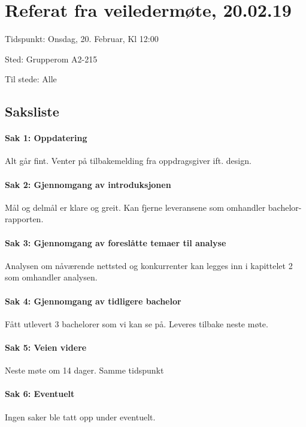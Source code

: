 \chapter{Referat fra veiledermøte, 20.02.19}

Tidspunkt: Onsdag, 20. Februar, Kl 12:00

Sted: Grupperom A2-215

Til stede: Alle	

\section{Saksliste}

\subsubsection{Sak 1: Oppdatering}
Alt går fint. Venter på tilbakemelding fra oppdragsgiver ift. design. 

\subsubsection{Sak 2: Gjennomgang av introduksjonen}
Mål og delmål er klare og greit. Kan fjerne leveransene som omhandler 
bachelor-rapporten. 

\subsubsection{Sak 3: Gjennomgang av foreslåtte temaer til analyse}
Analysen om nåværende nettsted og konkurrenter kan legges inn i kapittelet 2 som
omhandler analysen.

\subsubsection{Sak 4: Gjennomgang av tidligere bachelor}
Fått utlevert 3 bachelorer som vi kan se på. Leveres tilbake neste møte. 

\subsubsection{Sak 5: Veien videre}
Neste møte om 14 dager. Samme tidspunkt

\subsubsection{Sak 6: Eventuelt}
Ingen saker ble tatt opp under eventuelt.